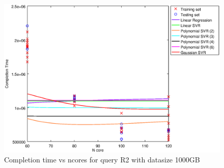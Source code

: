 
\begin {figure}[hbtp]
\centering
\includegraphics[width=\textwidth]{output/R2_1000_1_OVER_NCORES/plot_R2_1000.eps}
\caption{Completion time vs ncores for query R2 with datasize 1000GB}
\label{fig:all_nonlinear_R2_1000}
\end {figure}
